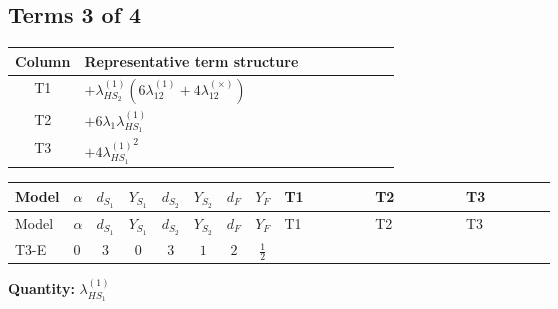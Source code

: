 \documentclass[8pt]{article}
\begin{document}
\begin{landscape}
\subsection*{Terms 3 of 4}
\begin{center}
\begin{tabular}{@{}c >{\raggedright\arraybackslash}p{0.82\linewidth}@{}}
\toprule
Column & Representative term structure \\
\midrule
T1 & \(\displaystyle +{\lambda_{HS_2}^{(1)}} (6 {\lambda_{12}^{(1)}}+4 {\lambda_{12}^{(\times)}})\) \\
\midrule
T2 & \(\displaystyle +6 {\lambda_1} {\lambda_{HS_1}^{(1)}}\) \\
\midrule
T3 & \(\displaystyle +4 {\lambda_{HS_1}^{(1)}}^2\) \\
\midrule
\bottomrule
\end{tabular}
\end{center}
\smallskip
\tiny
\begin{longtable}{@{}llcccccc >{\raggedright\arraybackslash}p{0.21\linewidth} >{\raggedright\arraybackslash}p{0.21\linewidth} >{\raggedright\arraybackslash}p{0.21\linewidth}@{}}
\toprule
Model & $\alpha$ & $d_{S_1}$ & $Y_{S_1}$ & $d_{S_2}$ & $Y_{S_2}$ & $d_F$ & $Y_F$ & T1 & T2 & T3 \\
\midrule
\endfirsthead
\toprule
Model & $\alpha$ & $d_{S_1}$ & $Y_{S_1}$ & $d_{S_2}$ & $Y_{S_2}$ & $d_F$ & $Y_F$ & T1 & T2 & T3 \\
\midrule
\endhead
T3-E & $0$ & $3$ & $0$ & $3$ & $1$ & $2$ & $\frac{1}{2}$ & \scriptsize\adjustbox{max width=\linewidth}{$\begin{gathered} +{\lambda_{HS_2}^{(1)}} (6 {\lambda_{12}^{(1)}}+4 {\lambda_{12}^{(\times)}})\end{gathered}$} & \scriptsize\adjustbox{max width=\linewidth}{$\begin{gathered} +6 {\lambda_1} {\lambda_{HS_1}^{(1)}}\end{gathered}$} & \scriptsize\adjustbox{max width=\linewidth}{$\begin{gathered} +4 {\lambda_{HS_1}^{(1)}}^2\end{gathered}$} \\
\midrule
\bottomrule
\end{longtable}
\clearpage
\noindent\textbf{Quantity: }$\lambda_{HS_1}^{(1)}$\par\smallskip

\end{landscape}
\end{document}
